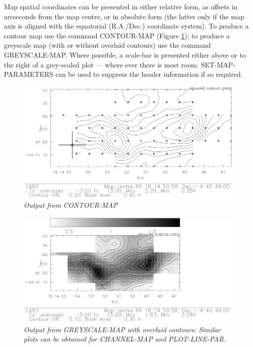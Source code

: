 \documentclass[11pt,twoside]{report}
\begin{document}
Map spatial coordinates can be presented in either relative form, as offsets
in arcseconds from the map centre, or in absolute form (the latter only if
the map axis is aligned with the equatorial (R.A./Dec.) coordinate system).
To produce a contour map use the command CONTOUR-MAP (Figure \ref{CONTOUR}); to
produce a greyscale map (with or without overlaid contours) use the command
GREYSCALE-MAP. Where possible, a scale-bar is
presented either above or to the right of a grey-scaled plot --- where ever
there is most room. SET-MAP-PARAMETERS can be used to suppress the header
information if so required.

\begin{figure}[htbp]
\begin{center}
\includegraphics[scale=0.65]{contour.ps}
\protect\parbox{5.5in}
{\caption[CONTOUR]
{\sl
Output from CONTOUR-MAP
\label{CONTOUR}
}
}
\end{center}
\end{figure}

\begin{figure}[htbp]
\begin{center}
\includegraphics[scale=0.75]{greyscale.ps}
\protect\parbox{5.5in}
{\caption[GREYSCALE]
{\sl
Output from GREYSCALE-MAP with overlaid contours: Similar plots can be
obtained for CHANNEL-MAP and PLOT-LINE-PAR.
\label{GREYSCALE}
}
}
\end{center}
\end{figure}
\end{document}
